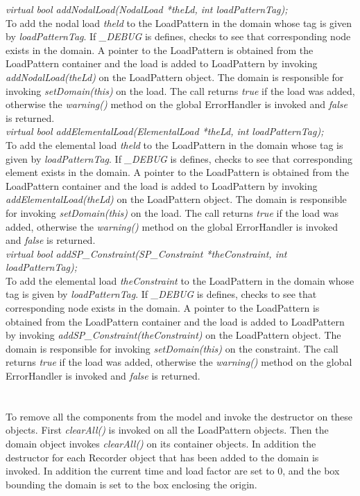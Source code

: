 {\em virtual bool addNodalLoad(NodalLoad *theLd, int loadPatternTag);}  \\ 
To add the nodal load {\em theld} to the LoadPattern in the domain
whose tag is given by {\em loadPatternTag}.
If {\em \_DEBUG} is defines, checks to see that corresponding node
exists in the domain. A pointer to the LoadPattern is obtained from
the LoadPattern container and the load is added to LoadPattern by
invoking {\em addNodalLoad(theLd)} on the LoadPattern object. The
domain is responsible for invoking {\em setDomain(this)} on the
load. The call returns {\em true} if the load was added, otherwise the
{\em warning()} method on the global ErrorHandler is invoked and {\em
false} is returned.\\ 


{\em virtual bool addElementalLoad(ElementalLoad *theLd, int loadPatternTag);}  \\ 
To add the elemental load {\em theld} to the LoadPattern in the domain
whose tag is given by {\em loadPatternTag}.
If {\em \_DEBUG} is defines, checks to see that corresponding element
exists in the domain. A pointer to the LoadPattern is obtained from
the LoadPattern container and the load is added to LoadPattern by
invoking {\em addElementalLoad(theLd)} on the LoadPattern object. The
domain is responsible for invoking {\em setDomain(this)} on the
load. The call returns {\em true} if the load was added, otherwise the
{\em warning()} method on the global ErrorHandler is invoked and {\em
false} is returned.\\ 


{\em virtual bool addSP\_Constraint(SP\_Constraint *theConstraint, int
loadPatternTag);}  \\  
To add the elemental load {\em theConstraint} to the LoadPattern in the domain
whose tag is given by {\em loadPatternTag}.
If {\em \_DEBUG} is defines, checks to see that corresponding node
exists in the domain. A pointer to the LoadPattern is obtained from
the LoadPattern container and the load is added to LoadPattern by
invoking {\em addSP\_Constraint(theConstraint)} on the LoadPattern object. The
domain is responsible for invoking {\em setDomain(this)} on the
constraint. The call returns {\em true} if the load was added, otherwise the
{\em warning()} method on the global ErrorHandler is invoked and {\em
false} is returned.\\ 


  \\
\\
To remove all the components from the model and invoke the destructor
on these objects. First {\em clearAll()} is invoked on all the
LoadPattern objects. Then the domain object invokes {\em
clearAll()} on its container objects. In addition the destructor for
each Recorder object that has been added to the domain is invoked. In
addition the current time and load factor are set to $0$, and the box
bounding the domain is set to the box enclosing the origin. \\


